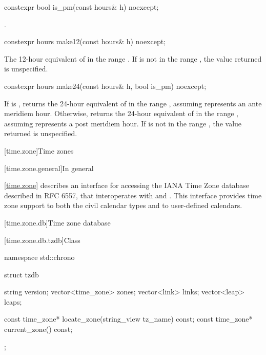 %
\begin{itemdecl}
constexpr bool is_pm(const hours& h) noexcept;
\end{itemdecl}

\begin{itemdescr}
\pnum
\returns
{}.
\end{itemdescr}

%
\begin{itemdecl}
constexpr hours make12(const hours& h) noexcept;
\end{itemdecl}

\begin{itemdescr}
\pnum
\returns
The 12-hour equivalent of  in the range .
If  is not in the range ,
the value returned is unspecified.
\end{itemdescr}

%
\begin{itemdecl}
constexpr hours make24(const hours& h, bool is_pm) noexcept;
\end{itemdecl}

\begin{itemdescr}
\pnum
\returns
If  is ,
returns the 24-hour equivalent of 
in the range ,
assuming  represents an ante meridiem hour.
Otherwise,
returns the 24-hour equivalent of 
in the range ,
assuming  represents a post meridiem hour.
If  is not in the range ,
the value returned is unspecified.
\end{itemdescr}

[time.zone]{Time zones}

[time.zone.general]{In general}

\pnum
\ref{time.zone} describes an interface for accessing
the IANA Time Zone database described in RFC 6557,
that interoperates with  and .
This interface provides time zone support to
both the civil calendar types
and to user-defined calendars.

[time.zone.db]{Time zone database}

[time.zone.db.tzdb]{Class }

\begin{codeblock}
namespace std::chrono {
  struct tzdb {
    string            version;
    vector<time_zone> zones;
    vector<link>      links;
    vector<leap>      leaps;

    const time_zone* locate_zone(string_view tz_name) const;
    const time_zone* current_zone() const;
  };
}
\end{codeblock}

